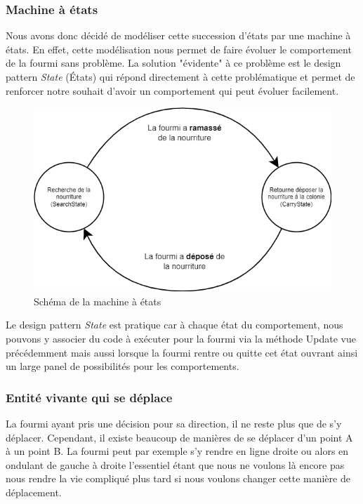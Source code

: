 \documentclass{EPUProjetDi}
\begin{document}
\subsubsection{Machine à états}

Nous avons donc décidé de modéliser cette succession d'états par une machine à états. En effet, cette modélisation nous permet de faire évoluer 
le comportement de la fourmi sans problème. La solution "évidente" à ce problème est le design pattern \textit{State} (États) qui répond
directement à cette problématique et permet de renforcer notre souhait d'avoir un comportement qui peut évoluer facilement.

\begin{figure}[h]
    \centering
    \includegraphics[scale=0.4]{statemachine.png}
    \caption{Schéma de la machine à états}
    \label{fig:state_machine}
\end{figure}

Le design pattern \textit{State} est pratique car à chaque état du comportement, nous pouvons y associer du code à exécuter pour la fourmi via la méthode 
Update vue précédemment mais aussi lorsque la fourmi rentre ou quitte cet état ouvrant ainsi un large panel de possibilités pour les comportements. 

\subsubsection{Entité vivante qui se déplace}

La fourmi ayant pris une décision pour sa direction, il ne reste plus que de s'y déplacer. Cependant, il existe beaucoup de manières de se déplacer
d'un point A à un point B. La fourmi peut par exemple s'y rendre en ligne droite ou alors en ondulant de gauche à droite l'essentiel étant que nous
ne voulons là encore pas nous rendre la vie compliqué plus tard si nous voulons changer cette manière de déplacement.
\end{document}
